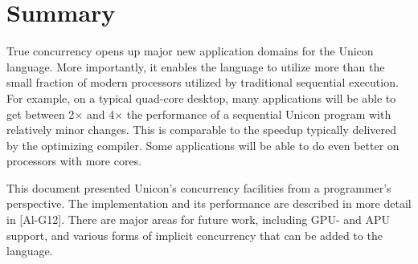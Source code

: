 

\section{Summary}

True concurrency opens up major new application domains for the Unicon language.
More importantly, it enables the language to utilize more than the small
fraction of modern processors utilized by traditional sequential execution. For
example, on a typical quad-core desktop, many applications will be able to get
between 2$\times$ and 4$\times$ the performance of a sequential Unicon program
with relatively minor changes. This is comparable to the speedup typically
delivered by the optimizing compiler.  Some applications will be able to do even
better on processors with more cores.

This document presented Unicon's concurrency facilities from a programmer's
perspective. The implementation and its performance are described in more detail
in [Al-G12]. There are major areas for future work, including GPU- and APU
support, and various forms of implicit concurrency that can be added to the
language.
